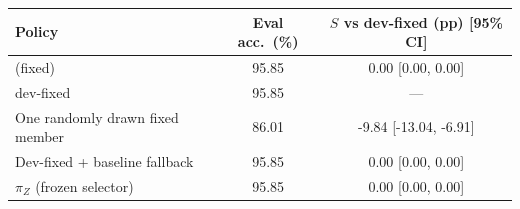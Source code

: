 \begin{tabular}{@{}lcc@{}}
\toprule
Policy & Eval acc.\ (\%) & $S$ vs dev-fixed (pp) [95\% CI] \\
\midrule
\bare{} (fixed) & 95.85 & 0.00 [0.00, 0.00] \\
dev-fixed & 95.85 & --- \\
One randomly drawn fixed member & 86.01 & -9.84 [-13.04, -6.91] \\
Dev-fixed + baseline fallback & 95.85 & 0.00 [0.00, 0.00] \\
$\pi_Z$ (frozen selector) & 95.85 & 0.00 [0.00, 0.00] \\
\bottomrule
\end{tabular}
